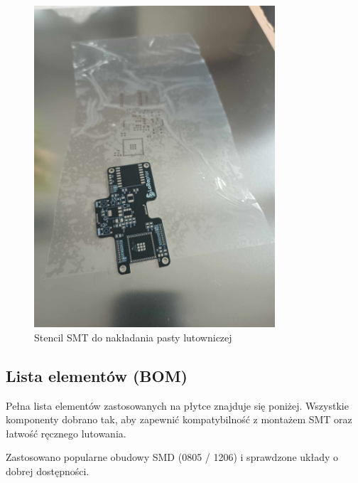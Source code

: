 \clearpage
\begin{figure}[htbp]
	\centering
	\includegraphics[width=0.8\textwidth]{root/pcb_stencil.jpg}
	\caption{Stencil SMT do nakładania pasty lutowniczej}
\end{figure}

\clearpage
\subsection{Lista elementów (BOM)}

Pełna lista elementów zastosowanych na płytce znajduje się poniżej. Wszystkie komponenty dobrano tak, aby zapewnić kompatybilność z montażem SMT oraz łatwość ręcznego lutowania.

Zastosowano popularne obudowy SMD (0805 / 1206) i sprawdzone układy o dobrej dostępności.

